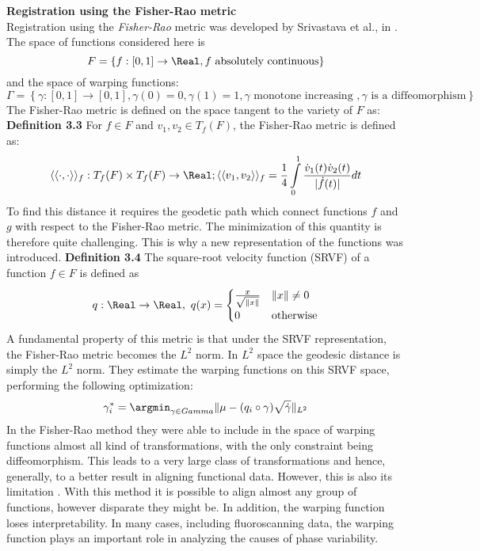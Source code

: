 \noindent
{\bf{Registration using the Fisher-Rao metric}} \\
Registration using the {\emph{Fisher-Rao}} metric was developed by Srivastava et al., in \cite{Srivastava_etal_2011_v2_arXiv}. The space of functions considered here is
\[ F = \left\{f: [0,1] \rightarrow \Real, f \text{ absolutely continuous}  \right\}\] and the space of warping functions:
\[ \Gamma = \left\{\gamma: [0,1] \rightarrow [0,1], \gamma(0) = 0, \gamma(1) = 1, \gamma \text{ monotone increasing }, \gamma \text{ is a diffeomorphism}  \right\} \]
The Fisher-Rao metric is defined on the space tangent to the variety of $F$ as:
{\bf{Definition 3.3}} For $f \in F$ and $v_1, v_2 \in T_f(F)$, the Fisher-Rao metric is defined as: 
\[ \langle\langle \cdot , \cdot \rangle \rangle_f: T_f(F) \times T_f(F) \rightarrow \Real; \langle\langle v_1 , v_2 \rangle \rangle_f = \frac{1}{4} \displaystyle \int \limits_0^1 \frac{\dot{v}_1(t) \dot{v}_2(t)}{|\dot{f}(t) |}dt \]
To find this distance it requires the geodetic path which connect functions $f$ and $g$ with respect to the Fisher-Rao metric. The minimization of this quantity is therefore quite challenging. This is why a  new representation of the functions was introduced.
{\bf{Definition 3.4}} The square-root velocity function (SRVF) of a function $f \in F$ is defined as
\[ q:\Real \rightarrow \Real, \ q(x) = 
  \begin{cases}
    \frac{x}{\sqrt{\|x \|}}       & \|x\| \ne 0 \\
    0 & \text{otherwise} \\
  \end{cases} 
\] 
A fundamental property of this metric is that under the SRVF representation, the Fisher-Rao metric becomes the $L^2$ norm. In $L^2$ space the geodesic distance is simply the $L^2$ norm. They estimate the warping functions on this SRVF space, performing the following optimization:
\[ \gamma_i^* = \argmin_{\gamma \in Gamma} \|\mu - (q_i \circ \gamma)\sqrt{\dot{\gamma}}  \|_{L^2} \]
In the Fisher-Rao method they were able to include in the space of warping functions almost all kind of transformations, with the only constraint being diffeomorphism. This leads to a very large class of transformations and hence, generally, to a better result in aligning functional data. However, this is also its limitation \cite{Patriarca_2013_PhDThesis}. With this method it is possible to align almost any group of functions, however disparate they might be. In addition, the warping function loses interpretability. In many cases, including fluoroscanning data, the warping function plays an important role in analyzing the causes of phase variability. 

